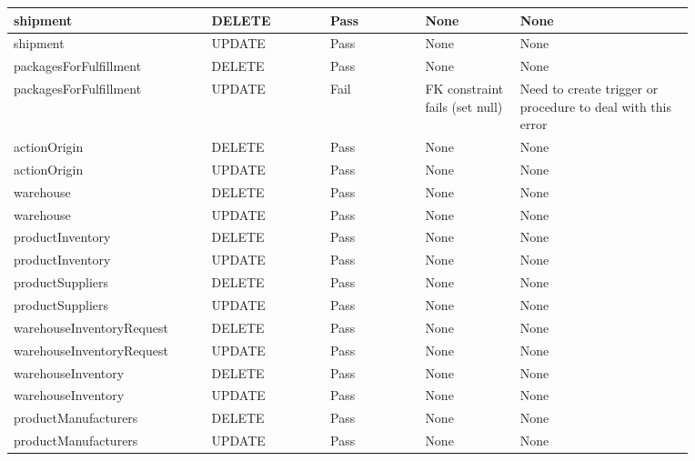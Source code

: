 \begin{spacing}{1.25}
\begin{longtable}{ | p{0.25\linewidth} | p{0.15\linewidth} | p{0.126\linewidth} | p{0.128\linewidth} | p{0.22\linewidth} | }
shipment					&	DELETE		&	Pass		&	None							&	None				\\\hline
shipment					&	UPDATE		&	Pass		&	None							&	None				\\\hline
packagesForFulfillment		&	DELETE		&	Pass		&	None							&	None				\\\hline
packagesForFulfillment		&	UPDATE		&	Fail		&	FK constraint fails (set null)	&	Need to create trigger or procedure to deal with this error\\\hline
actionOrigin				&	DELETE		&	Pass		&	None							&	None				\\\hline
actionOrigin				&	UPDATE		&	Pass		&	None							&	None				\\\hline
warehouse					&	DELETE		&	Pass		&	None							&	None				\\\hline
warehouse					&	UPDATE		&	Pass		&	None							&	None				\\\hline
productInventory			&	DELETE		&	Pass		&	None							&	None				\\\hline
productInventory			&	UPDATE		&	Pass		&	None							&	None				\\\hline
productSuppliers			&	DELETE		&	Pass		&	None							&	None				\\\hline
productSuppliers			&	UPDATE		&	Pass		&	None							&	None				\\\hline
warehouseInventoryRequest	&	DELETE		&	Pass		&	None							&	None				\\\hline
warehouseInventoryRequest	&	UPDATE		&	Pass		&	None							&	None				\\\hline
warehouseInventory			&	DELETE		&	Pass		&	None							&	None				\\\hline
warehouseInventory			&	UPDATE		&	Pass		&	None							&	None				\\\hline
productManufacturers		&	DELETE		&	Pass		&	None							&	None				\\\hline
productManufacturers		&	UPDATE		&	Pass		&	None							&	None				\\\hline
\end{longtable}
\end{spacing}